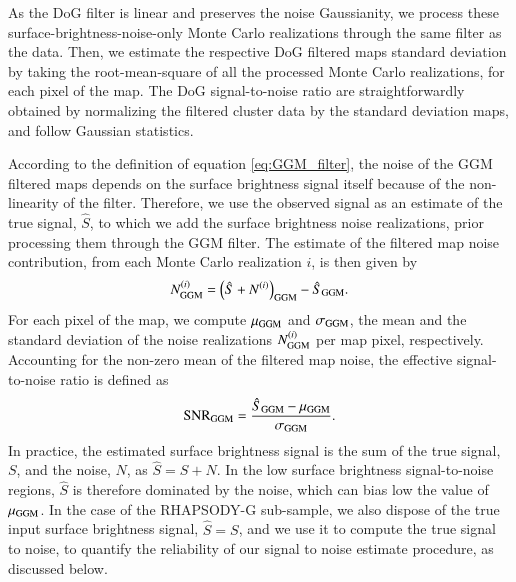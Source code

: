 \documentclass[twocolumn,traditabstract]{aa}
\begin{document}
As the DoG filter is linear and preserves the noise Gaussianity, we process these surface-brightness-noise-only Monte Carlo realizations through the same filter as the data. Then, we estimate the respective DoG filtered maps standard deviation by taking the root-mean-square of all the processed Monte Carlo realizations, for each pixel of the map. The DoG signal-to-noise ratio are straightforwardly obtained by normalizing the filtered cluster data by the standard deviation maps, and follow Gaussian statistics.

According to the definition of equation \ref{eq:GGM_filter}, the noise of the GGM filtered maps depends on the surface brightness signal itself because of the non-linearity of the filter. Therefore, we use the observed signal as an estimate of the true signal, $\hat{S}$, to which we add the surface brightness noise realizations, prior processing them through the GGM filter. The estimate of the filtered map noise contribution, from each Monte Carlo realization $i$, is then given by
\begin{equation}
	N^{(i)}_{\rm GGM} = \left(\hat{S} + N^{(i)}\right)_{\rm GGM} -  \hat{S}_{\rm GGM}.
	\label{eq:GGM_filter_noise}
\end{equation}
For each pixel of the map, we compute $\mu_{\rm GGM}$ and $\sigma_{\rm GGM}$, the mean and the standard deviation of the noise realizations $N^{(i)}_{\rm GGM}$ per map pixel, respectively. Accounting for the non-zero mean of the filtered map noise, the effective signal-to-noise ratio is defined as 
\begin{equation}
{\rm SNR}_{\rm GGM} = \frac{\hat{S}_{\rm GGM} - \mu_{\rm GGM}}{\sigma_{\rm GGM}}.
	\label{eq:GGM_filter_snr}
\end{equation}
In practice, the estimated surface brightness signal is the sum of the true signal, $S$, and the noise, $N$, as $\hat{S} = S + N$. In the low surface brightness signal-to-noise regions, $\hat{S}$ is therefore dominated by the noise, which can bias low the value of $\mu_{\rm GGM}$. In the case of the RHAPSODY-G sub-sample, we also dispose of the true input surface brightness signal, $\hat{S} = S$, and we use it to compute the true signal to noise, to quantify the reliability of our signal to noise estimate procedure, as discussed below.
\end{document}
